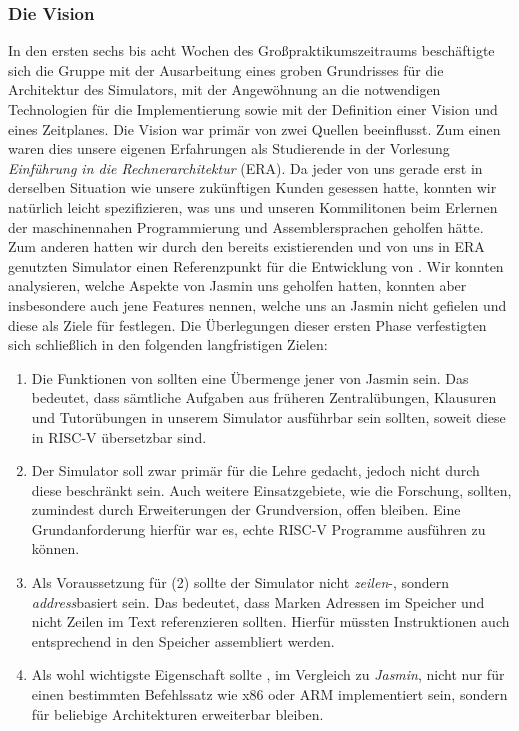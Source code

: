 
\subsubsection{Die Vision}
\label{team:orga-plan-vision}

In den ersten sechs bis acht Wochen des Großpraktikumszeitraums beschäftigte
sich die Gruppe mit der Ausarbeitung eines groben Grundrisses für die
Architektur des Simulators, mit der Angewöhnung an die notwendigen Technologien
für die Implementierung sowie mit der Definition einer Vision und eines
Zeitplanes. Die Vision war primär von zwei Quellen beeinflusst. Zum einen waren
dies unsere eigenen Erfahrungen als Studierende in der Vorlesung
\emph{Einführung in die Rechnerarchitektur} (ERA). Da jeder von uns gerade erst
in derselben Situation wie unsere zukünftigen Kunden gesessen hatte, konnten wir
natürlich leicht spezifizieren, was uns und unseren Kommilitonen beim Erlernen
der maschinennahen Programmierung und Assemblersprachen geholfen hätte. Zum
anderen hatten wir durch den bereits existierenden und von uns in ERA genutzten
Simulator einen Referenzpunkt für die Entwicklung von \erasim{}. Wir konnten
analysieren, welche Aspekte von Jasmin uns geholfen hatten, konnten aber
insbesondere auch jene Features nennen, welche uns an Jasmin nicht gefielen und
diese als Ziele für \erasim{} festlegen. Die Überlegungen dieser ersten Phase
verfestigten sich schließlich in den folgenden langfristigen Zielen:

\begin{enumerate}
  \item Die Funktionen von \erasim{} sollten eine Übermenge jener von Jasmin
  sein. Das bedeutet, dass sämtliche Aufgaben aus früheren Zentralübungen,
  Klausuren und Tutorübungen in unserem Simulator ausführbar sein sollten,
  soweit diese in RISC-V übersetzbar sind.
  \item Der Simulator soll zwar primär für die Lehre gedacht, jedoch nicht durch
  diese beschränkt sein. Auch weitere Einsatzgebiete, wie die Forschung,
  sollten, zumindest durch Erweiterungen der Grundversion, offen bleiben. Eine
  Grundanforderung hierfür war es, echte RISC-V Programme ausführen zu können.
  \item Als Voraussetzung für (2) sollte der Simulator nicht \emph{zeilen}-,
  sondern \emph{address}basiert sein. Das bedeutet, dass Marken Adressen im
  Speicher und nicht Zeilen im Text referenzieren sollten. Hierfür müssten
  Instruktionen auch entsprechend in den Speicher assembliert werden.
  \item Als wohl wichtigste Eigenschaft sollte \erasim{}, im Vergleich zu
  \emph{Jasmin}, nicht nur für einen bestimmten Befehlssatz wie x86 oder ARM
  implementiert sein, sondern für beliebige Architekturen erweiterbar bleiben.
\end{enumerate}
